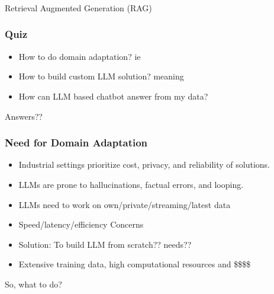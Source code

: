 \begin{frame}[fragile]\frametitle{}
\begin{center}
{\Large Retrieval Augmented Generation (RAG)}
\end{center}
\end{frame}

\begin{frame}[fragile]\frametitle{Quiz}
  \begin{itemize}
    \item How to do domain adaptation? ie
	\item How to build custom LLM solution? meaning
	\item How can LLM based chatbot answer from my data?
  \end{itemize}
  
  Answers??
  
\end{frame}

\begin{frame}[fragile]\frametitle{Need for Domain Adaptation}

\begin{itemize}
\item Industrial settings prioritize cost, privacy, and reliability of solutions.
\item LLMs are prone to hallucinations, factual errors, and looping.
\item LLMs need to work on own/private/streaming/latest data
\item Speed/latency/efficiency Concerns
\item Solution: To build LLM from scratch?? needs?? 
\item Extensive training data, high computational resources and \$\$\$\$
\end{itemize}	

So, what to do?

\end{frame}

